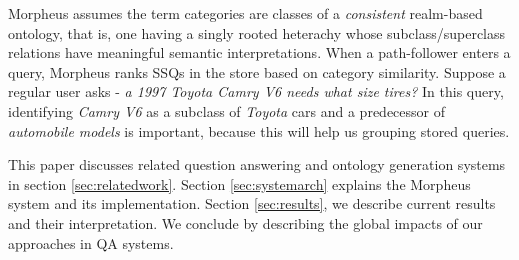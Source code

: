 Morpheus assumes the term categories are classes of a
\textit{consistent} realm-based ontology, that is, one having a singly rooted heterachy whose
subclass/superclass relations have meaningful semantic interpretations. When a path-follower enters a query, Morpheus ranks SSQs in the store based on category similarity. Suppose a
regular user asks -\textit{ a 1997 Toyota Camry V6 needs what size tires?} In
this query, identifying \textit{Camry V6} as a subclass of \textit{Toyota} cars
and a predecessor of \textit{automobile models} is important, because this will
help us grouping stored queries.


This paper discusses related question answering and ontology generation systems in section \ref{sec:relatedwork}. Section \ref{sec:systemarch} explains the Morpheus system and its implementation. Section \ref{sec:results}, we describe current results and their
interpretation. We conclude by describing the global impacts
of our approaches in QA systems.
